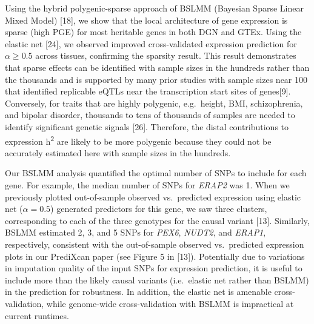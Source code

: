 \documentclass[]{article}
\begin{document}
Using the hybrid polygenic-sparse approach of BSLMM (Bayesian Sparse
Linear Mixed Model) {[}18{]}, we show that the local architecture of
gene expression is sparse (high PGE) for most heritable genes in both
DGN and GTEx. Using the elastic net {[}24{]}, we observed improved
cross-validated expression prediction for \(\alpha \geq 0.5\) across
tissues, confirming the sparsity result. This result demonstrates that
sparse effects can be identified with sample sizes in the hundreds
rather than the thousands and is supported by many prior studies with
sample sizes near 100 that identified replicable eQTLs near the
transcription start sites of genes{[}9{]}. Conversely, for traits that
are highly polygenic, e.g.~height, BMI, schizophrenia, and bipolar
disorder, thousands to tens of thousands of samples are needed to
identify significant genetic signals {[}26{]}. Therefore, the distal
contributions to expression h\textsuperscript{2} are likely to be more
polygenic because they could not be accurately estimated here with
sample sizes in the hundreds.

Our BSLMM analysis quantified the optimal number of SNPs to include for
each gene. For example, the median number of SNPs for \emph{ERAP2} was
1. When we previously plotted out-of-sample observed vs.~predicted
expression using elastic net (\(\alpha=0.5\)) generated predictors for
this gene, we saw three clusters, corresponding to each of the three
genotypes for the causal variant {[}13{]}. Similarly, BSLMM estimated 2,
3, and 5 SNPs for \emph{PEX6}, \emph{NUDT2}, and \emph{ERAP1},
respectively, consistent with the out-of-sample observed vs.~predicted
expression plots in our PrediXcan paper (see Figure 5 in {[}13{]}).
Potentially due to variations in imputation quality of the input SNPs
for expression prediction, it is useful to include more than the likely
causal variants (i.e.~elastic net rather than BSLMM) in the prediction
for robustness. In addition, the elastic net is amenable
cross-validation, while genome-wide cross-validation with BSLMM is
impractical at current runtimes.
\end{document}
